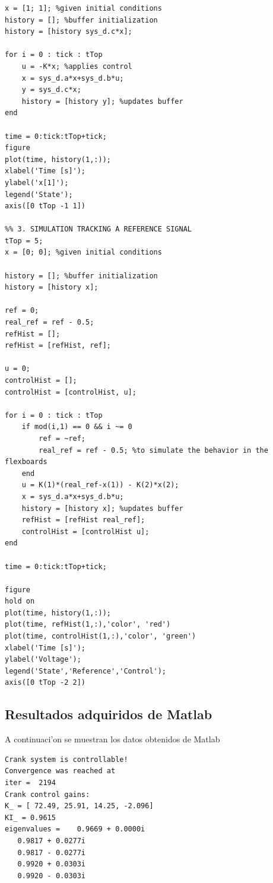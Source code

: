  {\tiny
\lstset{language=Matlab, breaklines=true, basicstyle=\footnotesize}
\begin{lstlisting}[frame=single]
%% 2. SIMULATION IN FRONT OF GIVEN CONDITIONS
x = [1; 1]; %given initial conditions
history = []; %buffer initialization
history = [history sys_d.c*x];

for i = 0 : tick : tTop
    u = -K*x; %applies control
    x = sys_d.a*x+sys_d.b*u;
    y = sys_d.c*x;
    history = [history y]; %updates buffer
end

time = 0:tick:tTop+tick;
figure
plot(time, history(1,:));
xlabel('Time [s]');
ylabel('x[1]');
legend('State');
axis([0 tTop -1 1])

%% 3. SIMULATION TRACKING A REFERENCE SIGNAL
tTop = 5;
x = [0; 0]; %given initial conditions

history = []; %buffer initialization
history = [history x];

ref = 0;
real_ref = ref - 0.5;
refHist = [];
refHist = [refHist, ref];

u = 0;
controlHist = [];
controlHist = [controlHist, u];

for i = 0 : tick : tTop
    if mod(i,1) == 0 && i ~= 0
        ref = ~ref;
        real_ref = ref - 0.5; %to simulate the behavior in the flexboards
    end
    u = K(1)*(real_ref-x(1)) - K(2)*x(2);
    x = sys_d.a*x+sys_d.b*u;
    history = [history x]; %updates buffer
    refHist = [refHist real_ref];
    controlHist = [controlHist u];
end

time = 0:tick:tTop+tick;

figure
hold on
plot(time, history(1,:));
plot(time, refHist(1,:),'color', 'red')
plot(time, controlHist(1,:),'color', 'green')
xlabel('Time [s]');
ylabel('Voltage');
legend('State','Reference','Control');
axis([0 tTop -2 2])
\end{lstlisting}
}
\subsection{Resultados adquiridos de Matlab}
A continuaci'on se muestran los datos obtenidos de Matlab
 {\tiny
\lstset{language=Matlab, breaklines=true, basicstyle=\footnotesize}
\begin{lstlisting}[frame=single]
Crank system is controllable!
Convergence was reached at
iter =  2194
Crank control gains:
K_ = [ 72.49, 25.91, 14.25, -2.096] 
KI_ = 0.9615
eigenvalues =    0.9669 + 0.0000i
   0.9817 + 0.0277i
   0.9817 - 0.0277i
   0.9920 + 0.0303i
   0.9920 - 0.0303i
\end{lstlisting}
}

